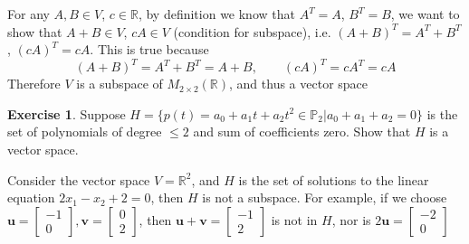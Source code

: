 \documentclass{beamer}
\theoremstyle{definition}
\newtheorem{exercise}[theorem]{Exercise}
\theoremstyle{remark}
\begin{document}
\begin{frame}[t]
\begin{solution}
For any $A,B\in V$, $c\in\mathbb R$, by definition we know that $A^T=A$, $B^T=B$, we want to show that $A+B\in V$, $cA\in V$ (condition for subspace), i.e. $(A+B)^T=A^T+B^T$, $(cA)^T=cA$. This is true because
\[
(A+B)^T=A^T+B^T=A+B,\qquad (cA)^T=cA^T=cA
\]
Therefore $V$ is a subspace of $M_{2\times2}(\mathbb R)$, and thus a vector space
\end{solution}
\pause
\begin{exercise}
Suppose $H=\{p(t)=a_0+a_1t+a_2t^2\in\mathbb P_2|a_0+a_1+a_2=0\}$ is the set of polynomials of degree $\leq 2$ and sum of coefficients zero. Show that $H$ is a vector space.
\end{exercise}
\end{frame}

\begin{frame}[t]
\begin{example}\label{15:10-06/23/2022}
Consider the vector space $V=\mathbb R^2$, and $H$ is the set of solutions to the linear equation $2x_1-x_2+2=0$, then $H$ is not a subspace. For example, if we choose $\mathbf u=\begin{bmatrix}
-1\\0
\end{bmatrix},\mathbf v=\begin{bmatrix}
0\\2
\end{bmatrix}$, then $\mathbf u+\mathbf v=\begin{bmatrix}
-1\\2
\end{bmatrix}$ is not in $H$, nor is $2\mathbf u=\begin{bmatrix}
-2\\0
\end{bmatrix}$
\vspace{-10mm}
\begin{center}
\end{center}
\end{example}
\end{frame}
\end{document}
